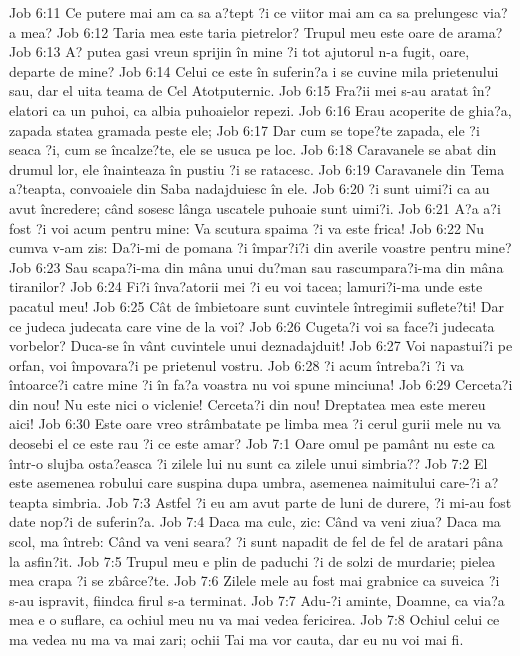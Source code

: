 Job 6:11  Ce putere mai am ca sa a?tept ?i ce viitor mai am ca sa prelungesc via?a mea?
Job 6:12  Taria mea este taria pietrelor? Trupul meu este oare de arama?
Job 6:13  A? putea gasi vreun sprijin în mine ?i tot ajutorul n-a fugit, oare, departe de mine?
Job 6:14  Celui ce este în suferin?a i se cuvine mila prietenului sau, dar el uita teama de Cel Atotputernic.
Job 6:15  Fra?ii mei s-au aratat în?elatori ca un puhoi, ca albia puhoaielor repezi.
Job 6:16  Erau acoperite de ghia?a, zapada statea gramada peste ele;
Job 6:17  Dar cum se tope?te zapada, ele ?i seaca ?i, cum se încalze?te, ele se usuca pe loc.
Job 6:18  Caravanele se abat din drumul lor, ele înainteaza în pustiu ?i se ratacesc.
Job 6:19  Caravanele din Tema a?teapta, convoaiele din Saba nadajduiesc în ele.
Job 6:20  ?i sunt uimi?i ca au avut încredere; când sosesc lânga uscatele puhoaie sunt uimi?i.
Job 6:21  A?a a?i fost ?i voi acum pentru mine: Va scutura spaima ?i va este frica!
Job 6:22  Nu cumva v-am zis: Da?i-mi de pomana ?i împar?i?i din averile voastre pentru mine?
Job 6:23  Sau scapa?i-ma din mâna unui du?man sau rascumpara?i-ma din mâna tiranilor?
Job 6:24  Fi?i înva?atorii mei ?i eu voi tacea; lamuri?i-ma unde este pacatul meu!
Job 6:25  Cât de îmbietoare sunt cuvintele întregimii suflete?ti! Dar ce judeca judecata care vine de la voi?
Job 6:26  Cugeta?i voi sa face?i judecata vorbelor? Duca-se în vânt cuvintele unui deznadajduit!
Job 6:27  Voi napastui?i pe orfan, voi împovara?i pe prietenul vostru.
Job 6:28  ?i acum întreba?i ?i va întoarce?i catre mine ?i în fa?a voastra nu voi spune minciuna!
Job 6:29  Cerceta?i din nou! Nu este nici o viclenie! Cerceta?i din nou! Dreptatea mea este mereu aici!
Job 6:30  Este oare vreo strâmbatate pe limba mea ?i cerul gurii mele nu va deosebi el ce este rau ?i ce este amar?
Job 7:1  Oare omul pe pamânt nu este ca într-o slujba osta?easca ?i zilele lui nu sunt ca zilele unui simbria??
Job 7:2  El este asemenea robului care suspina dupa umbra, asemenea naimitului care-?i a?teapta simbria.
Job 7:3  Astfel ?i eu am avut parte de luni de durere, ?i mi-au fost date nop?i de suferin?a.
Job 7:4  Daca ma culc, zic: Când va veni ziua? Daca ma scol, ma întreb: Când va veni seara? ?i sunt napadit de fel de fel de aratari pâna la asfin?it.
Job 7:5  Trupul meu e plin de paduchi ?i de solzi de murdarie; pielea mea crapa ?i se zbârce?te.
Job 7:6  Zilele mele au fost mai grabnice ca suveica ?i s-au ispravit, fiindca firul s-a terminat.
Job 7:7  Adu-?i aminte, Doamne, ca via?a mea e o suflare, ca ochiul meu nu va mai vedea fericirea.
Job 7:8  Ochiul celui ce ma vedea nu ma va mai zari; ochii Tai ma vor cauta, dar eu nu voi mai fi.
